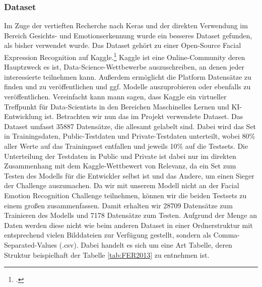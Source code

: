 \documentclass[12pt, a4paper]{scrbook}
\begin{document}
\subsubsection{Dataset}
Im Zuge der vertieften Recherche nach Keras und der direkten Verwendung im Bereich Gesichts- und Emotionserkennung wurde ein besseres Dataset gefunden, als bisher verwendet wurde. Das Dataset gehört zu einer Open-Source Facial Expression Recognition auf Kaggle.\footcite[Vgl.][]{FER-Challenge} Kaggle ist eine Online-Community deren Hauptzweck es ist, Data-Science-Wettbewerbe auszuschreiben, an denen jeder interessierte teilnehmen kann. Außerdem ermöglicht die Platform Datensätze zu finden und zu veröffentlichen und ggf. Modelle auszuprobieren oder ebenfalls zu veröffentlichen. Vereinfacht kann mann sagen, dass Kaggle ein virtueller Treffpunkt für Data-Scientists in den Bereichen Maschinelles Lernen und KI-Entwicklung ist.\newline
Betrachten wir nun das im Projekt verwendete Dataset.
Das Dataset umfasst 35887 Datensätze, die allesamt gelabelt sind. Dabei wird das Set in Trainingsdaten, Public-Testdaten und Private-Testdaten unterteilt, wobei 80\% aller Werte auf das Trainingsset entfallen und jeweils 10\% auf die Testsets. Die Unterteilung der Testdaten in Public und Private ist dabei nur im direkten Zusammenhang mit dem Kaggle-Wettbewert von Relevanz, da ein Set zum Testen des Modells für die Entwickler selbst ist und das Andere, um einen Sieger der Challenge auszumachen. Da wir mit unserem Modell nicht an der Facial Emotion Recognition Challenge teilnehmen, können wir die beiden Testsets zu einem großen zusammenfassen. Damit erhalten wir 28709 Datensätze zum Trainieren des Modells und 7178 Datensätze zum Testen. Aufgrund der Menge an Daten werden diese nicht wie beim anderen Dataset in einer Ordnerstruktur mit entsprechend vielen Bilddateien zur Verfügung gestellt, sondern als Comma-Separated-Values (.csv). Dabei handelt es sich um eine Art Tabelle, deren Struktur beispielhaft der Tabelle \ref{tab:FER2013} zu entnehmen ist.
\end{document}
